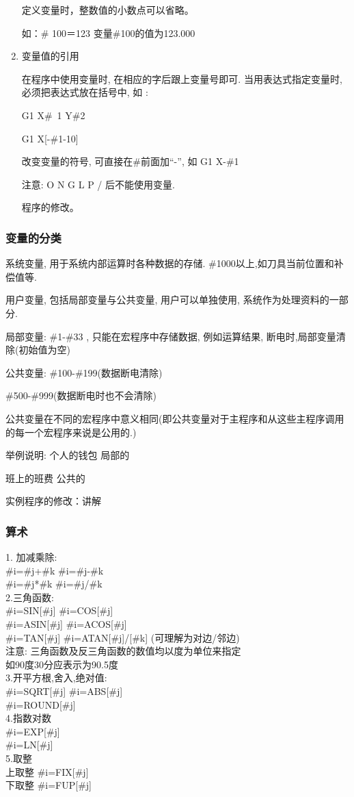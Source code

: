 \begin{enumerate}[1、]
定义变量时，整数值的小数点可以省略。

如：\# 100＝123   变量\#100的值为123.000

\item 变量值的引用

在程序中使用变量时, 在相应的字后跟上变量号即可. 当用表达式指定变量时, 必须把表达式放在括号中, 如
:

G1 X\#\ 1 Y\#2


G1 X[-\#1-10] 


改变变量的符号, 可直接在\#前面加“-”, 如 G1 X-\#1


注意: O N G L P / 后不能使用变量.


程序的修改。
\end{enumerate}

\subsubsection{变量的分类} 
系统变量, 用于系统内部运算时各种数据的存储. \#1000以上,如刀具当前位置和补偿值等.


用户变量, 包括局部变量与公共变量, 用户可以单独使用, 系统作为处理资料的一部分.


局部变量: \#1-\#33 , 只能在宏程序中存储数据, 例如运算结果, 断电时,局部变量清除(初始值为空)


公共变量: \#100-\#199(数据断电清除)


\#500-\#999(数据断电时也不会清除)


公共变量在不同的宏程序中意义相同(即公共变量对于主程序和从这些主程序调用的每一个宏程序来说是公用的.)


举例说明:  个人的钱包   局部的


班上的班费   公共的


实例程序的修改：讲解

\subsubsection{算术} 

1. 加减乘除:
\\
\#i=\#j+\#k           \#i=\#j-\#k
\\
\#i=\#j*\#k           \#i=\#j/\#k
 \\
2.三角函数:
\\
\#i=SIN[\#j]          \#i=COS[\#j]
\\
\#i=ASIN[\#j]         \#i=ACOS[\#j]
\\
\#i=TAN[\#j]         \#i=ATAN[\#j]/[\#k] (可理解为对边/邻边)
\\
注意: 三角函数及反三角函数的数值均以度为单位来指定
\\
如90度30分应表示为90.5度
\\
3.开平方根,舍入,绝对值:
\\
\#i=SQRT[\#j]        \#i=ABS[\#j]
\\
\#i=ROUND[\#j]
\\
4.指数对数
\\
\#i=EXP[\#j]
\\
\#i=LN[\#j]
\\
5.取整
\\
上取整  \#i=FIX[\#j]
\\
下取整  \#i=FUP[\#j]

